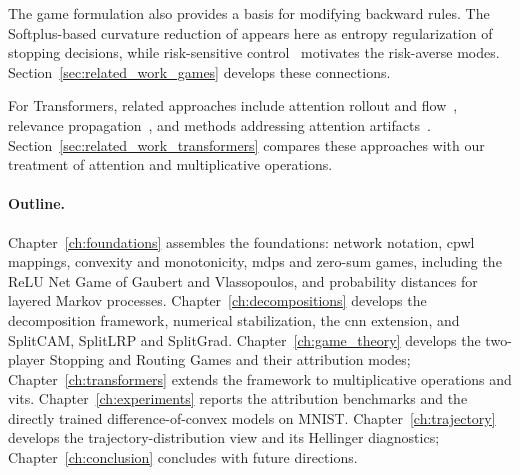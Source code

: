The game formulation also provides a basis for modifying backward rules. The Softplus-based curvature reduction of \textcite{Dombrowski2020} appears here as entropy regularization of stopping decisions, while risk-sensitive control~\parencite{zhang2021risk} motivates the risk-averse modes. Section~\ref{sec:related_work_games} develops these connections.

For Transformers, related approaches include attention rollout and flow~\parencite{Abnar2020attention}, relevance propagation~\parencite{Chefer2021ICCV,Chefer2021GenericAttention,Ali2022AttnLRP,Achtibat2024AttnLRP}, and methods addressing attention artifacts~\parencite{Wrobel2024,darcet2024vision}. Section~\ref{sec:related_work_transformers} compares these approaches with our treatment of attention and multiplicative operations.

\paragraph{Outline.}
Chapter~\ref{ch:foundations} assembles the foundations: network notation, \ac{cpwl} mappings, convexity and monotonicity, \acp{mdp} and zero-sum games, including the ReLU Net Game of Gaubert and Vlassopoulos, and probability distances for layered Markov processes. Chapter~\ref{ch:decompositions} develops the decomposition framework, numerical stabilization, the \ac{cnn} extension, and SplitCAM, SplitLRP and SplitGrad. Chapter~\ref{ch:game_theory} develops the two-player Stopping and Routing Games and their attribution modes; Chapter~\ref{ch:transformers} extends the framework to multiplicative operations and \acp{vit}. Chapter~\ref{ch:experiments} reports the attribution benchmarks and the directly trained difference-of-convex models on MNIST. Chapter~\ref{ch:trajectory} develops the trajectory-distribution view and its Hellinger diagnostics; Chapter~\ref{ch:conclusion} concludes with future directions.

